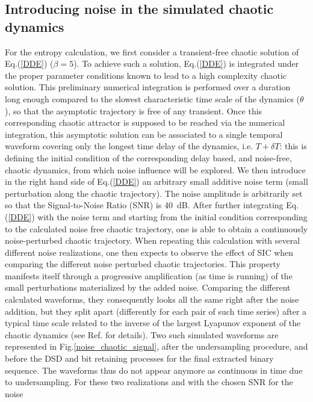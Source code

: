 \subsection{Introducing noise in the simulated chaotic dynamics}
%
For the entropy calculation, we first consider a transient-free
chaotic solution of Eq.(\ref{DDE}) ($\beta=5$). To achieve such a
solution, Eq.(\ref{DDE}) is integrated under the proper parameter
conditions known to lead to a high complexity chaotic solution. This
preliminary numerical integration is performed over a duration long
enough compared to the slowest characteristic time scale of the
dynamics ($\theta$), so that the asymptotic trajectory is free of any
transient. Once this corresponding chaotic attractor is supposed to be
reached via the numerical integration, this asymptotic solution can be
associated to a single temporal waveform covering only the longest
time delay of the dynamics, i.e. $T+\delta T$: this is defining the
initial condition of the corresponding delay based, and noise-free,
chaotic dynamics, from which noise influence will be explored. We then
introduce in the right hand side of Eq.(\ref{DDE}) an arbitrary small
additive noise term (small perturbation along the chaotic
trajectory). The noise amplitude is arbitrarily set so that the
Signal-to-Noise Ratio (SNR) is 40~dB. After further integrating
Eq.(\ref{DDE}) with the noise term and starting from the initial
condition corresponding to the calculated noise free chaotic
trajectory, one is able to obtain a continuously noise-perturbed
chaotic trajectory. When repeating this calculation with several
different noise realizations, one then expects to observe the effect
of SIC when comparing the different noise perturbed chaotic
trajectories. This property manifests itself through a progressive
amplification (as time is running) of the small perturbations
materialized by the added noise. Comparing the different calculated
waveforms, they consequently looks all the same right after the noise
addition, but they split apart (differently for each pair of such time
series) after a typical time scale related to the inverse of the
largest Lyapunov exponent of the chaotic dynamics (see
Ref.\cite{PhysRevE.85.016211} for details). Two such simulated
waveforms are represented in Fig.\ref{noise_chaotic_signal}, after the
undersampling procedure, and before the DSD and bit retaining
processes for the final extracted binary sequence. The waveforms thus
do not appear anymore as continuous in time due to undersampling. For
these two realizations and with the chosen SNR for the noise

